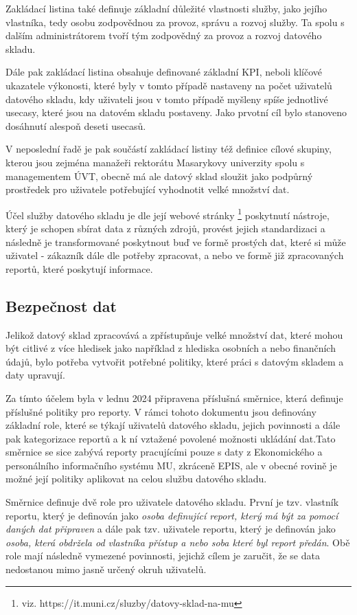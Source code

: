 \documentclass[
  digital,     %
  twoside,     %
  lof,         %
  lot,         %
]{fithesis4}
\begin{document}
Zakládací listina také definuje základní důležité vlastnosti služby, jako jejího vlastníka, tedy osobu zodpovědnou za provoz, správu a rozvoj služby. Ta spolu s dalším administrátorem tvoří tým zodpovědný za provoz a rozvoj datového skladu.

Dále pak zakládací listina obsahuje definované základní KPI, neboli klíčové ukazatele výkonosti, které byly v tomto případě nastaveny na počet uživatelů datového skladu, kdy uživateli jsou v tomto případě myšleny spíše jednotlivé usecasy, které jsou na datovém skladu postaveny. Jako prvotní cíl bylo stanoveno dosáhnutí alespoň deseti usecasů.

V neposlední řadě je pak součástí zakládací listiny též definice cílové skupiny, kterou jsou zejména manažeři rektorátu Masarykovy univerzity spolu s managementem ÚVT, obecně má ale datový sklad sloužit jako podpůrný prostředek pro uživatele potřebující vyhodnotit velké množství dat.

Účel služby datového skladu je dle její webové stránky \footnote{viz. https://it.muni.cz/sluzby/datovy-sklad-na-mu} poskytnutí nástroje, který je schopen sbírat data z různých zdrojů, provést jejich standardizaci a následně je transformované poskytnout buď ve formě prostých dat, které si může uživatel - zákazník dále dle potřeby zpracovat, a nebo ve formě již zpracovaných reportů, které poskytují informace. 
\subsection{Bezpečnost dat}
\label{data_sec}
Jelikož datový sklad zpracovává a zpřístupňuje velké množství dat, které mohou být citlivé z více hledisek jako například z hlediska osobních a nebo finančních údajů, bylo potřeba vytvořit potřebné politiky, které práci s datovým skladem a daty upravují. 

Za tímto účelem byla v lednu 2024 připravena příslušná směrnice, která definuje příslušné politiky pro reporty. V rámci tohoto dokumentu jsou definovány základní role, které se týkají uživatelů datového skladu, jejich povinnosti a dále pak kategorizace reportů a k ní vztažené povolené možnosti ukládání dat.Tato směrnice se sice zabývá reporty pracujícími pouze s daty z Ekonomického a personálního informačního systému MU, zkráceně EPIS, ale v obecné rovině je možné její politiky aplikovat na celou službu datového skladu. \parencite{UVTMUNI2024}

Směrnice definuje dvě role pro uživatele datového skladu. První je tzv. vlastník reportu, který je definován jako \emph{osoba definující report, který má být za pomocí daných dat připraven} a dále pak tzv. uživatele reportu, který je definován jako \emph{osoba, která obdržela od vlastníka přístup a nebo soba které byl report předán}. Obě role mají následně vymezené povinnosti, jejichž cílem je zaručit, že se data nedostanou mimo jasně určený okruh uživatelů. 
\end{document}
